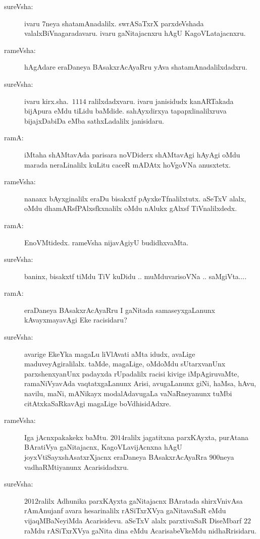 \begin{description}
\item[sureVsha:] ivaru $7$neya shatamAnadalilx. swrASaTxrX parxdeVshada valalxBiVnagaradavaru. ivaru gaNitajacnxru hAgU KagoVLatajacnxru.

\item[rameVsha:] hAgAdare eraDaneya BAsakxrAcAyaRru yAva shatamAnadalilxdadxru.

\item[sureVsha:] ivaru kirx.sha.\ $1114$ ralilxdadxvaru. ivaru janisidudx kanARTakada bijApura eMdu tiLidu baMdide. sahAyxdirxya tapapxlinalilxruva bijajxDabiDa eMba sathxLadalilx janisidaru.

\item[ramA:] iMtaha shAMtavAda parisara noVDiderx shAMtavAgi hAyAgi oMdu marada neraLinalilx kuLitu caceR mADAtx hoVgoVNa anusxtetx.

\item[rameVsha:] nananx bAyxginalilx eraDu bisakxtf pAyxkeTfnalilxtutx. aSeTxV alalx, oMdu dhamARsfPAlxsfkxnalilx oMdu nAlukx gAlxsf TiVnalilxdedx.

\item[ramA:] EnoVMtidedx. rameVsha nijavAgiyU budidhxvaMta.

\item[sureVsha:] baninx, bisakxtf tiMdu TiV kuDidu .. muMduvarisoVNa .. saMgiVta....

\item[ramA:] eraDaneya BAsakxrAcAyaRru I gaNitada samaseyxgaLanunx kAvayxmayavAgi Eke racisidaru?

\item[sureVsha:] avarige EkeYka magaLu liVlAvati aMta idudx, avaLige maduveyAgi\-ralilalx. taMde, magaLige, oMdoMdu sUtarxvanUnx parxshenxyanUnx padayxda rUpa\-dalilx racisi kivige iMpAgiruvaMte, ramaNiVyavAda vaqtatxgaLanunx Arisi, avugaLanunx giNi, haMsa, hAvu, navilu, maNi, mANikayx modalAdavugaLa\- vaNaRneyanunx tuMbi citAtxkaSaRkavAgi magaLige boVdhisidAdxre.

\item[rameVsha:] Iga jAcnxpakakekx baMtu. $2014$ralilx jagatitxna parxKAyxta, purAtana BAratiVya gaNitajacnx, KagoVLavijAcnxna hAgU joyxVtiSayxshAsatxrXjacnx eraDaneya BAsakxrAcAyaRra $900$neya vadhaRMtiyanunx Acarisidadxru.

\item[sureVsha:] $2012$ralilx Adhunika parxKAyxta gaNitajacnx BAratada shirxVnivAsa rAmAnujanf avara hesarinalilx rASiTxrXVya gaNitavaSaR eMdu vijaqMBaNeyiMda Acarisidevu. aSeTxV alalx parxtivaSaR DiseMbarf $22$raMdu rASiTxrXVya gaNita dina eMdu AcarisabeVkeMdu nidhaRrisidaru.


\end{description}
